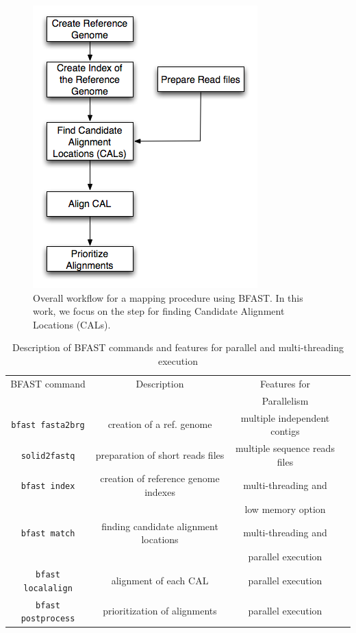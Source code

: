 \documentclass[12pt]{article}
\begin{document}
\begin{figure}
 \centering
\includegraphics[scale=0.45]{figures/workflow.png} 

\caption{\small Overall workflow for a mapping procedure using BFAST.  In this work, we focus on the step for finding Candidate Alignment Locations (CALs).  }
  \label{fig:workflow-bfast} 
 \end{figure}


\begin{table}
\begin{tabular}{|c|c|c|c|} 
  \hline 
 BFAST command & Description & Features for \\ 
  &  &     Parallelism \\ \hline \hline
\texttt{bfast fasta2brg} & creation of a ref. genome  &    multiple independent contigs \\ \hline 
\texttt{solid2fastq}  &  preparation of short reads files &     multiple sequence reads files \\ \hline

\texttt{bfast index} & creation of reference genome indexes& multi-threading and  \\
 &   & low memory option  \\  \hline
\texttt{bfast match} & finding candidate alignment locations  &  multi-threading and  \\
& &  parallel execution \\ \hline
\texttt{bfast localalign} & alignment of each CAL  &   parallel execution \\  \hline
\texttt{bfast postprocess} & prioritization of alignments  &  parallel execution \\ \hline


\hline
\end{tabular} \caption{Description of BFAST commands and features for parallel and multi-threading execution}
 \label{table:bfast-summary} 
\end{table}
\end{document}
